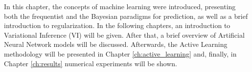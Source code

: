 In this chapter, the concepts of machine learning were introduced, presenting both the frequentist and the Bayesian paradigms for prediction, as well as a brief introduction to regularization.
In the following chapters, an introduction to Variational Inference (VI) will be given. After that, a brief overview of Artificial Neural Network models will be discussed. Afterwards, the Active Learning methodology will be presented in Chapter \ref{ch:active_learning} and, finally, in Chapter \ref{ch:results} numerical experiments will be shown.
